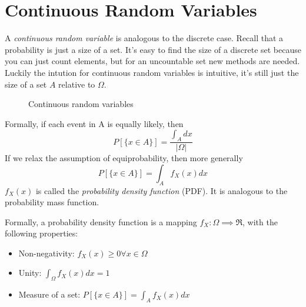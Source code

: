 \section{Continuous Random Variables}

A \emph{continuous random variable} is
analogous to the discrete case. Recall that
a probability is just a size of a set.
It's easy to find the size of a discrete set
because you can just count elements, but for
an uncountable set new methods are needed. Luckily
the intution for continuous random variables is
intuitive, it's still just the size of a set $A$
relative to $\Omega$.
\begin{figure}[h]
    \centering
    \caption{Continuous random variables}
\end{figure}
Formally, if each event in A is equally likely, then
\begin{equation}
    P[\{x \in A\}] = \frac{\int_{A}dx}{|\Omega|}
\end{equation}
If we relax the assumption of equiprobability, then
more generally
\begin{equation}
    P[\{x\in A\}] = \int_{A} f_X(x) dx
\end{equation}
$f_X(x)$ is called the \emph{probability density function} (PDF).
It is analogous to the probability mass function.

Formally, a probability density function
is a mapping $f_X: \Omega \implies \Re$,
with the following properties:
\begin{itemize}
    \item Non-negativity: $f_X(x) \geq 0 \forall x \in \Omega$
    \item Unity: $\int_{\Omega} f_X(x)dx = 1$
    \item Measure of a set: $P[\{x \in A\}] = \int_{A}f_X(x) dx$
\end{itemize}

